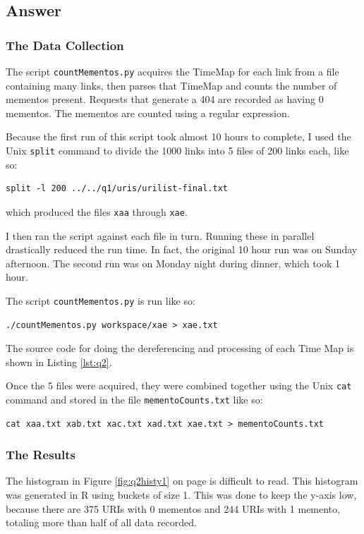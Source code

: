\documentclass[letterpaper,11pt]{article}
\begin{document}
\newpage
\subsection*{Answer}

\subsubsection*{The Data Collection}
The script \verb+countMementos.py+ acquires the TimeMap for each link from a file containing many links, then parses that TimeMap and counts the number of mementos present.  Requests that generate a 404 are recorded as having 0 mementos.  The mementos are counted using a regular expression.

Because the first run of this script took almost 10 hours to complete, I used the Unix \verb+split+ command to divide the 1000 links into 5 files of 200 links each, like so:
\begin{lstlisting}[frame=single]
split -l 200 ../../q1/uris/urilist-final.txt
\end{lstlisting}
which produced the files \verb+xaa+ through \verb+xae+.

I then ran the script against each file in turn.  Running these in parallel drastically reduced the run time.  In fact, the original 10 hour run was on Sunday afternoon.  The second run was on Monday night during dinner, which took 1 hour.

The script \verb+countMementos.py+ is run like so:
\begin{lstlisting}[frame=single]
./countMementos.py workspace/xae > xae.txt
\end{lstlisting}

The source code for doing the dereferencing and processing of each Time Map is shown in Listing \ref{lst:q2}.

Once the 5 files were acquired, they were combined together using the Unix \verb+cat+ command and stored in the file \verb+mementoCounts.txt+ like so:
\begin{lstlisting}[frame=single]
cat xaa.txt xab.txt xac.txt xad.txt xae.txt > mementoCounts.txt
\end{lstlisting}

\subsubsection*{The Results}

The histogram in Figure \ref{fig:q2histy1} on page \pageref{fig:q2histy1} is difficult to read.  This histogram was generated in R using buckets of size 1.  This was done to keep the y-axis low, because there are 375 URIs with 0 mementos and 244 URIs with 1 memento, totaling more than half of all data recorded.
\end{document}

